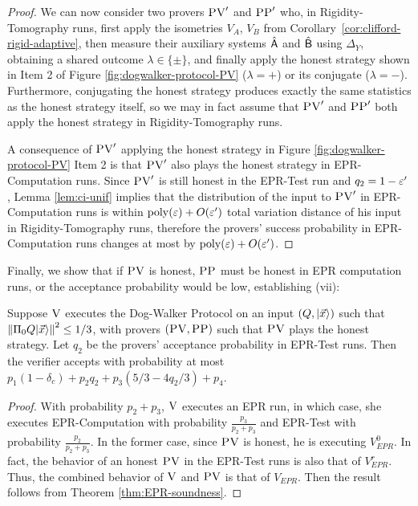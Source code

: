 \begin{proof}
We can now consider two provers $\textsc{PV}'$ and $\textsc{PP}'$ who, in Rigidity-Tomography runs, first apply the isometries $V_A$, $V_B$ from Corollary~\ref{cor:clifford-rigid-adaptive}, then  measure their auxiliary systems $\hat{{\textsf{A}}}$ and $\hat{{\textsf{B}}}$ using $\Delta_Y$, obtaining a shared outcome $\lambda\in\{\pm\}$, and finally apply the honest strategy shown in Item 2 of Figure \ref{fig:dogwalker-protocol-PV} ($\lambda=+$) or its conjugate ($\lambda = -$). Furthermore, conjugating the honest strategy produces exactly the same statistics as the honest strategy itself, so we may in fact assume that $\textsc{PV}'$ and $\textsc{PP}'$ both apply the honest strategy in Rigidity-Tomography runs. 


A consequence of $\textsc{PV}'$ applying the honest strategy in Figure \ref{fig:dogwalker-protocol-PV} Item 2 is that $\textsc{PV}'$ also plays the honest strategy in EPR-Computation runs. Since $\textsc{PV}'$ is still honest in the EPR-Test run and $q_2 = 1-\varepsilon'$, Lemma \ref{lem:ci-unif} implies that the distribution of the input to $\textsc{PV}'$ in EPR-Computation runs is within $\operatorname{poly}(\varepsilon)+O(\varepsilon')$ total variation distance of his input in
Rigidity-Tomography runs, therefore the provers' success probability in EPR-Computation runs changes at most by $\mathrm{poly}(\varepsilon)+O(\varepsilon')$. 
\end{proof}


Finally, we show that if $\textsc{PV}$ is honest, $\textsc{PP}$ must be honest in EPR computation runs, or the acceptance probability would be low, establishing (vii):
\begin{lemma}\label{lem:PP-3}
Suppose $\textsc{V}$ %
 executes the Dog-Walker Protocol on an input $(Q,|\vec{x}\rangle)$ such that $\left\|\Pi_0 Q|\vec{x}\rangle\right\|^2\leq 1/3$, with provers $(\textsc{PV},\textsc{PP})$ such that $\textsc{PV}$ plays the honest strategy. Let $q_2$ be the provers' acceptance probability in EPR-Test runs. Then the verifier accepts with probability at most
  $p_1(1-\delta_c) +p_2q_2+p_3(5/3-4q_2/3)+p_4$. 
\end{lemma}
\begin{proof}
With probability $p_2+p_3$, $\textsc{V}$ executes an EPR run, in which case, she executes EPR-Computation with probability $\frac{p_3}{p_2+p_3}$ and EPR-Test with probability $\frac{p_2}{p_2+p_3}$. In the former case, since $\textsc{PV}$ is honest, he is executing $V_{EPR}^0$. In fact, the behavior of an honest $\textsc{PV}$ in the EPR-Test runs is also that of $V_{EPR}^r$. Thus, the combined behavior of $\textsc{V}$ and $\textsc{PV}$ is that of $V_{EPR}$. Then the result follows from Theorem \ref{thm:EPR-soundness}. 
\end{proof}

